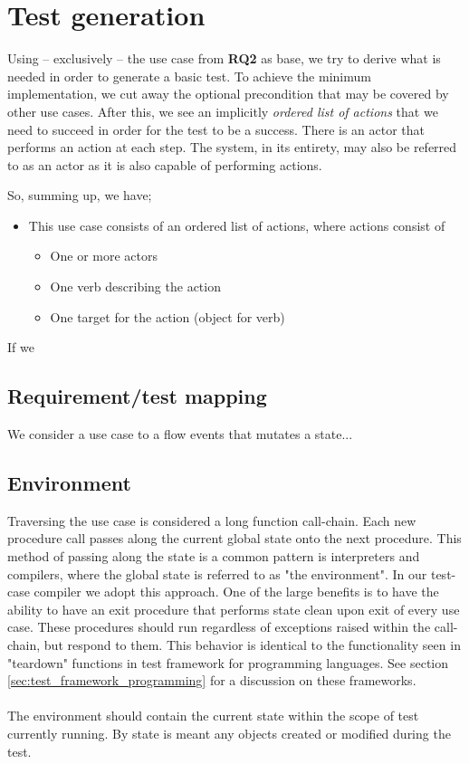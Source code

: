 \documentclass[10pt]{scrreprt}
\begin{document}
\chapter{Test generation}
Using -- exclusively -- the use case from \textbf{RQ2} as base, we try to derive what is needed in order to generate a basic test.
To achieve the minimum implementation, we cut away the optional precondition that may be covered by other use cases. After this, we see an implicitly \emph{ordered list of actions} that we need to succeed in order for the test to be a success. There is an actor that performs an action at each step. The system, in its entirety, may also be referred to as an actor as it is also capable of performing actions.

So, summing up, we have;
\begin{itemize}
  \item This use case consists of an ordered list of actions, where actions consist of
  \begin{itemize}
	\item One or more actors
	\item One verb describing the action
	\item One target for the action (object for verb)
  \end{itemize}
\end{itemize}
If we 

\section{Requirement/test mapping}

We consider a use case to a flow events that mutates a state...


\section{Environment}
Traversing the use case is considered a long function call-chain. Each new procedure call passes along the current global state onto the next procedure. This method of passing along the state is a common pattern is interpreters and compilers, where the global state is referred to as "the environment". In our test-case compiler we adopt this approach. One of the large benefits is to have the ability to have an exit procedure that performs state clean upon exit of every use case. These procedures should run regardless of exceptions raised within the call-chain, but respond to them. This behavior is identical to the functionality seen in "teardown" functions in test framework for programming languages. See section \ref{sec:test_framework_programming} for a discussion on these frameworks.\\\\
The environment should contain the current state within the scope of test currently running. By state is meant any objects created or modified during the test.
\end{document}
